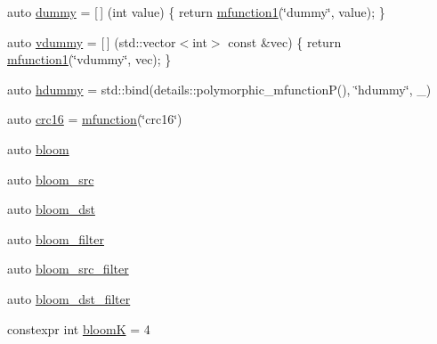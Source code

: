 \begin{DoxyCompactItemize}
auto \hyperlink{namespacepfq_1_1lang_1_1experimental_1_1anonymous__namespace_02experimental_8hpp_03_a5fc8274e9598b8524f833264174b62b7}{dummy} = \mbox{[}$\,$\mbox{]} (int value) \{ return \hyperlink{namespacepfq_1_1lang_a68d775c68562fbd0ab9ef213f2519499}{mfunction1}(\char`\"{}dummy\char`\"{}, value); \}
\item 
auto \hyperlink{namespacepfq_1_1lang_1_1experimental_1_1anonymous__namespace_02experimental_8hpp_03_a2226c8f9da114edfb9d457189dde1cbe}{vdummy} = \mbox{[}$\,$\mbox{]} (std\+::vector$<$int$>$ const \&vec) \{ return \hyperlink{namespacepfq_1_1lang_a68d775c68562fbd0ab9ef213f2519499}{mfunction1}(\char`\"{}vdummy\char`\"{}, vec); \}
\item 
auto \hyperlink{namespacepfq_1_1lang_1_1experimental_1_1anonymous__namespace_02experimental_8hpp_03_a6377eeaace811b051eaf2edffd4968f9}{hdummy} = std\+::bind(details\+::polymorphic\+\_\+mfunction\+P(), \char`\"{}hdummy\char`\"{}, \+\_)
\item 
auto \hyperlink{namespacepfq_1_1lang_1_1experimental_1_1anonymous__namespace_02experimental_8hpp_03_a8152d34c5c69cc26aaa2b4a14ed37af1}{crc16} = \hyperlink{namespacepfq_1_1lang_ac3ec84f09576bf5fb5db464623a4c165}{mfunction}(\char`\"{}crc16\char`\"{})
\item 
auto \hyperlink{namespacepfq_1_1lang_1_1experimental_1_1anonymous__namespace_02experimental_8hpp_03_a47efdb4619749db417f27b4ec9090c88}{bloom}
\item 
auto \hyperlink{namespacepfq_1_1lang_1_1experimental_1_1anonymous__namespace_02experimental_8hpp_03_a3d4a047a7fd3d6cb24151a72832153bb}{bloom\+\_\+src}
\item 
auto \hyperlink{namespacepfq_1_1lang_1_1experimental_1_1anonymous__namespace_02experimental_8hpp_03_a77e8efb950d2c9158cdcf00bce24bf1a}{bloom\+\_\+dst}
\item 
auto \hyperlink{namespacepfq_1_1lang_1_1experimental_1_1anonymous__namespace_02experimental_8hpp_03_ab40aacc9b6fcf65e19fb1479e96da50a}{bloom\+\_\+filter}
\item 
auto \hyperlink{namespacepfq_1_1lang_1_1experimental_1_1anonymous__namespace_02experimental_8hpp_03_ae39622e71bbc0eaa235b7dce5948891e}{bloom\+\_\+src\+\_\+filter}
\item 
auto \hyperlink{namespacepfq_1_1lang_1_1experimental_1_1anonymous__namespace_02experimental_8hpp_03_abdc0622697144c772102af575575c07f}{bloom\+\_\+dst\+\_\+filter}
\item 
constexpr int \hyperlink{namespacepfq_1_1lang_1_1experimental_1_1anonymous__namespace_02experimental_8hpp_03_ac1b8ebb18517de3143349d95a02f4b86}{bloom\+K} = 4

\end{DoxyCompactItemize}
